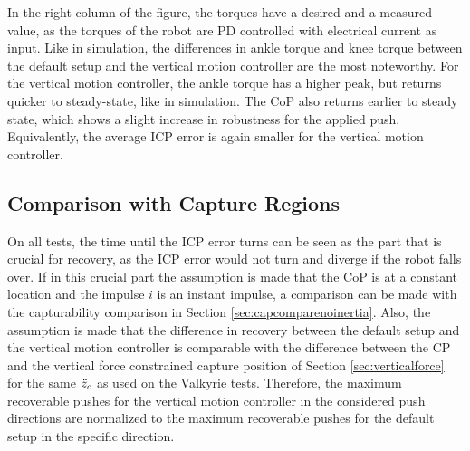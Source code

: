 In the right column of the figure, the torques have a desired and a measured value, as the torques of the robot are PD controlled with electrical current as input. Like in simulation, the differences in ankle torque and knee torque between the default setup and the vertical motion controller are the most noteworthy. For the vertical motion controller, the ankle torque has a higher peak, but returns quicker to steady-state, like in simulation.  The \ac{CoP} also returns earlier to steady state, which shows a slight increase in robustness for the applied push. Equivalently, the average \ac{ICP} error is again smaller for the vertical motion controller.

\subsection{Comparison with Capture Regions}
On all tests, the time until the \ac{ICP} error turns can be seen as the part that is crucial for recovery, as the \ac{ICP} error would not turn and diverge if the robot falls over. If in this crucial part the assumption is made that the \ac{CoP} is at a constant location and the impulse $i$ is an instant impulse, a comparison can be made with the capturability comparison in Section \ref{sec:capcomparenoinertia}. Also, the assumption is made that the difference in recovery between the default setup and the vertical motion controller is comparable with the difference between the \ac{CP} and the vertical force constrained capture position of Section \ref{sec:verticalforce} for the same $\ddot{z}_{c}$ as used on the Valkyrie tests. Therefore, the maximum recoverable pushes for the vertical motion controller in the considered push directions are normalized to the maximum recoverable pushes for the default setup in the specific direction.


